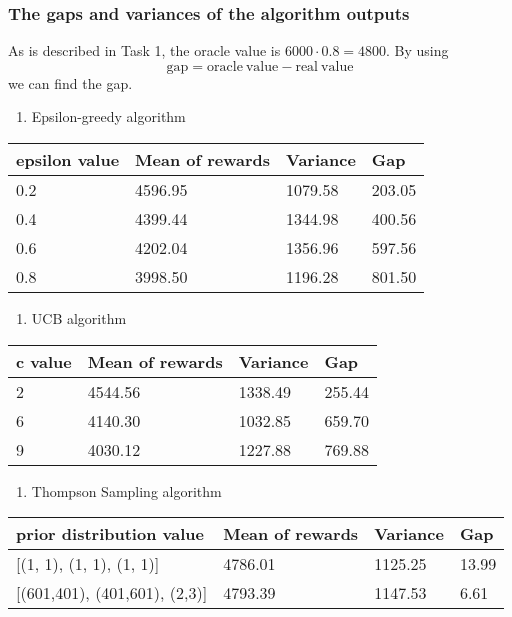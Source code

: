 \documentclass[11pt]{article}
\providecommand{\tightlist}{%
      \setlength{\itemsep}{0pt}\setlength{\parskip}{0pt}}
\begin{document}
\hypertarget{the-gaps-and-variances-of-the-algorithm-outputs}{%
\subsubsection{The gaps and variances of the algorithm
outputs}\label{the-gaps-and-variances-of-the-algorithm-outputs}}

As is described in Task 1, the oracle value is \(6000\cdot 0.8=4800\).
By using
\[\mathrm{gap} = \mathrm{oracle\ value} - \mathrm{real\ value}\] we can
find the gap.

\begin{enumerate}
\def\labelenumi{\arabic{enumi}.}
\tightlist
\item
  Epsilon-greedy algorithm
\end{enumerate}

\begin{longtable}[]{@{}llll@{}}
\toprule
epsilon value & Mean of rewards & Variance & Gap \\
\midrule
\endhead
0.2 & 4596.95 & 1079.58 & 203.05 \\
0.4 & 4399.44 & 1344.98 & 400.56 \\
0.6 & 4202.04 & 1356.96 & 597.56 \\
0.8 & 3998.50 & 1196.28 & 801.50 \\
\bottomrule
\end{longtable}

\begin{enumerate}
\def\labelenumi{\arabic{enumi}.}
\setcounter{enumi}{1}
\tightlist
\item
  UCB algorithm
\end{enumerate}

\begin{longtable}[]{@{}llll@{}}
\toprule
c value & Mean of rewards & Variance & Gap \\
\midrule
\endhead
2 & 4544.56 & 1338.49 & 255.44 \\
6 & 4140.30 & 1032.85 & 659.70 \\
9 & 4030.12 & 1227.88 & 769.88 \\
\bottomrule
\end{longtable}

\begin{enumerate}
\def\labelenumi{\arabic{enumi}.}
\setcounter{enumi}{2}
\tightlist
\item
  Thompson Sampling algorithm
\end{enumerate}

\begin{longtable}[]{@{}llll@{}}
\toprule
prior distribution value & Mean of rewards & Variance & Gap \\
\midrule
\endhead
{[}(1, 1), (1, 1), (1, 1){]} & 4786.01 & 1125.25 & 13.99 \\
{[}(601,401), (401,601), (2,3){]} & 4793.39 & 1147.53 & 6.61 \\
\bottomrule
\end{longtable}
\end{document}
